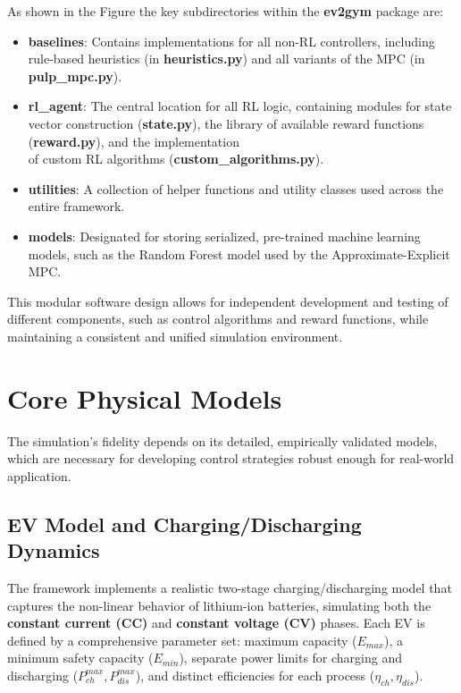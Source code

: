 As shown in the Figure  the key subdirectories within the \textbf{ev2gym} package are:
\begin{itemize}
    \item \textbf{baselines}: Contains implementations for all non-RL controllers, including rule-based heuristics (in \textbf{heuristics.py}) and all variants of the MPC (in \textbf{pulp\_mpc.py}).
    \item \textbf{rl\_agent}: The central location for all RL logic, containing modules for state vector construction (\textbf{state.py}), the library of available reward functions (\textbf{reward.py}), and the implementation 
\\
\noindent
of custom RL algorithms (\textbf{custom\_algorithms.py}).
    \item \textbf{utilities}: A collection of helper functions and utility classes used across the entire framework.
    \item \textbf{models}: Designated for storing serialized, pre-trained machine learning models, such as the Random Forest model used by the Approximate-Explicit MPC.
\end{itemize}

This modular software design allows for independent development and testing of different components, such as control algorithms and reward functions, while maintaining a consistent and unified simulation environment.

\section{Core Physical Models}
The simulation's fidelity depends on its detailed, empirically validated models, which are necessary for developing control strategies robust enough for real-world application.

\subsection{EV Model and Charging/Discharging Dynamics}
The framework implements a realistic two-stage charging/discharging model that captures the non-linear behavior of lithium-ion batteries, simulating both the \textbf{constant current (CC)} and \textbf{constant voltage (CV)} phases. Each EV is defined by a comprehensive parameter set: maximum capacity ($E_{max}$), a minimum safety capacity ($E_{min}$), separate power limits for charging and discharging ($P_{ch}^{max}, P_{dis}^{max}$), and distinct efficiencies for each process ($\eta_{ch}, \eta_{dis}$). 

